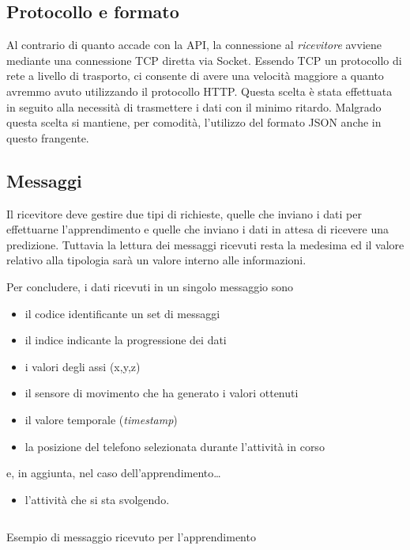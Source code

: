 \subsection{Protocollo e formato}
Al contrario di quanto accade con la API, la connessione al \textit{ricevitore} avviene mediante una connessione 
TCP diretta via Socket.
Essendo TCP un protocollo di rete a livello di trasporto, ci consente di avere una velocità maggiore a quanto avremmo avuto 
utilizzando il protocollo HTTP. Questa scelta è stata effettuata in seguito alla necessità di trasmettere i dati
con il minimo ritardo.
Malgrado questa scelta si mantiene, per comodità, l'utilizzo del formato JSON anche in questo frangente.


\subsection{Messaggi}
Il ricevitore deve gestire due tipi di richieste, quelle che inviano i dati per effettuarne l'apprendimento e quelle che inviano
i dati in attesa di ricevere una predizione. Tuttavia la lettura dei messaggi ricevuti resta la medesima ed il 
valore relativo alla tipologia sarà un valore interno alle informazioni.

Per concludere, i dati ricevuti in un singolo messaggio sono
\begin{itemize}
    \item il codice identificante un set di messaggi
    \item il indice indicante la progressione dei dati
    \item i valori degli assi (x,y,z)
    \item il sensore di movimento che ha generato i valori ottenuti
    \item il valore temporale (\textit{timestamp})
    \item la posizione del telefono selezionata durante l'attività in corso
\end{itemize}
e, in aggiunta, nel caso dell'apprendimento\dots
\begin{itemize}
    \item l'attività che si sta svolgendo.
\end{itemize}

\begin{listing}[H] 
    \inputminted[frame=single,framesep=10pt]{json}{snippets/server/receiver/message.json}
    \caption{Esempio di messaggio ricevuto per l'apprendimento}
\end{listing}

